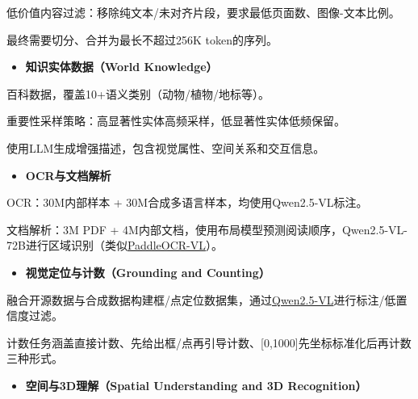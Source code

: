 \documentclass[zihao=false,fontset=windows]{ctexart}
\begin{document}
低价值内容过滤：移除纯文本/未对齐片段，要求最低页面数、图像-文本比例。\par

最终需要切分、合并为最长不超过256K token的序列。\par

\begin{itemize}[label=\textcolor{feishuBlue}{\textbullet}]
\item \textbf{知识实体数据（World Knowledge）}

\end{itemize}

百科数据，覆盖10+语义类别（动物/植物/地标等）。\par

重要性采样策略：高显著性实体高频采样，低显著性实体低频保留。\par

使用LLM生成增强描述，包含视觉属性、空间关系和交互信息。\par

\begin{itemize}[label=\textcolor{feishuBlue}{\textbullet}]
\item \textbf{OCR与文档解析}

\end{itemize}

OCR：30M内部样本 + 30M合成多语言样本，均使用Qwen2.5-VL标注。\par

文档解析：3M PDF + 4M内部文档，使用布局模型预测阅读顺序，Qwen2.5-VL-72B进行区域识别（类似\href{https://scnajei2ds6y.feishu.cn/wiki/CmMSw5yIki7NTckgkg7cayIxnWc}{PaddleOCR-VL}）。\par

\begin{itemize}[label=\textcolor{feishuBlue}{\textbullet}]
\item \textbf{视觉定位与计数（Grounding and Counting）}

\end{itemize}

融合开源数据与合成数据构建框/点定位数据集，通过\href{https://scnajei2ds6y.feishu.cn/wiki/S7Q2wviQhiYtQFk4jKvccQwDnWe}{Qwen2.5-VL}进行标注/低置信度过滤。\par

计数任务涵盖直接计数、先给出框/点再引导计数、[0,1000]先坐标标准化后再计数三种形式。\par

\begin{itemize}[label=\textcolor{feishuBlue}{\textbullet}]
\item \textcolor{feishuRed}{\textbf{空间与3D理解（Spatial Understanding and 3D Recognition）}}

\end{itemize}
\end{document}
